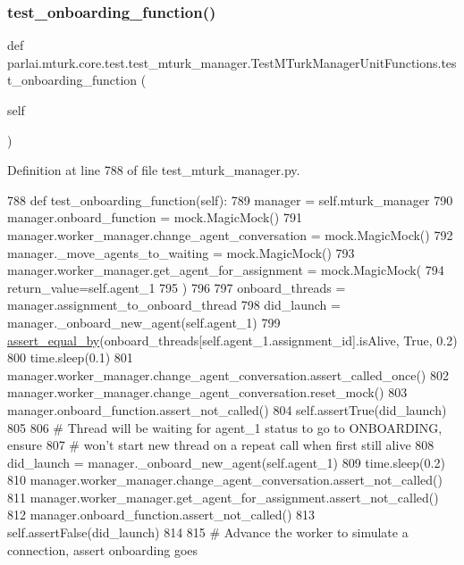 \subsubsection{\texorpdfstring{test\+\_\+onboarding\+\_\+function()}{test\_onboarding\_function()}}
{\footnotesize\ttfamily def parlai.\+mturk.\+core.\+test.\+test\+\_\+mturk\+\_\+manager.\+Test\+M\+Turk\+Manager\+Unit\+Functions.\+test\+\_\+onboarding\+\_\+function (\begin{DoxyParamCaption}\item[{}]{self }\end{DoxyParamCaption})}



Definition at line 788 of file test\+\_\+mturk\+\_\+manager.\+py.


\begin{DoxyCode}
788     \textcolor{keyword}{def }test\_onboarding\_function(self):
789         manager = self.mturk\_manager
790         manager.onboard\_function = mock.MagicMock()
791         manager.worker\_manager.change\_agent\_conversation = mock.MagicMock()
792         manager.\_move\_agents\_to\_waiting = mock.MagicMock()
793         manager.worker\_manager.get\_agent\_for\_assignment = mock.MagicMock(
794             return\_value=self.agent\_1
795         )
796 
797         onboard\_threads = manager.assignment\_to\_onboard\_thread
798         did\_launch = manager.\_onboard\_new\_agent(self.agent\_1)
799         \hyperlink{namespaceparlai_1_1mturk_1_1core_1_1test_1_1test__mturk__manager_a1fd7ac4fedefa65d2416601107dbe44c}{assert\_equal\_by}(onboard\_threads[self.agent\_1.assignment\_id].isAlive, \textcolor{keyword}{True}, 0.2)
800         time.sleep(0.1)
801         manager.worker\_manager.change\_agent\_conversation.assert\_called\_once()
802         manager.worker\_manager.change\_agent\_conversation.reset\_mock()
803         manager.onboard\_function.assert\_not\_called()
804         self.assertTrue(did\_launch)
805 
806         \textcolor{comment}{# Thread will be waiting for agent\_1 status to go to ONBOARDING, ensure}
807         \textcolor{comment}{# won't start new thread on a repeat call when first still alive}
808         did\_launch = manager.\_onboard\_new\_agent(self.agent\_1)
809         time.sleep(0.2)
810         manager.worker\_manager.change\_agent\_conversation.assert\_not\_called()
811         manager.worker\_manager.get\_agent\_for\_assignment.assert\_not\_called()
812         manager.onboard\_function.assert\_not\_called()
813         self.assertFalse(did\_launch)
814 
815         \textcolor{comment}{# Advance the worker to simulate a connection, assert onboarding goes}

\end{DoxyCode}
